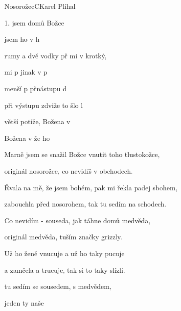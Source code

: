 \begin{song}{Nosorožec}{C}{Karel Plíhal}

\begin{SBVerse}

1.  jsem domů Božce  

      jsem ho v h

    rumy a dvě vodky př mi v krotký,

    mi p  jinak v p

    menší p přnástupu d

   př{i }výstupu  zdviže  to šlo l

    větší potíže,  Božena v 

    Božena v   že ho 

   \end{SBVerse}

\begin{SBVerse}

Marně jsem se snažil Božce vnutit toho tlustokožce,

   originál nosorožce, co nevidíš v obchodech.

   Řvala na mě, že jsem bohém, pak mi řekla padej sbohem,

   zabouchla před nosorohem, tak tu sedím na schodech.

   Co nevidím - souseda, jak táhne domů medvěda,

   originál medvěda, tuším značky grizzly.

   Už ho ženě vnucuje a už ho taky pucuje

   a zamčela a trucuje, tak si to taky slízli.

\end{SBVerse}

\begin{SBVerse}

tu sedím se sousedem, s  medvědem,

     jeden ty naše 

   \end{SBVerse}

   \end{song}
